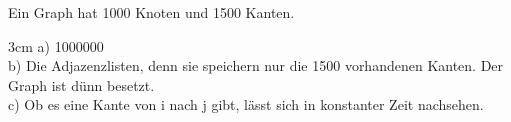 \question[3]
Ein Graph hat 1000 Knoten und 1500 Kanten.
\begin{solutionbox}{3cm}
a) 1000000 \\
b) Die Adjazenzlisten, denn sie speichern nur die 1500 vorhandenen Kanten. Der Graph ist dünn besetzt. \\
c) Ob es eine Kante von i nach j gibt, lässt sich in konstanter Zeit nachsehen.
\end{solutionbox}
